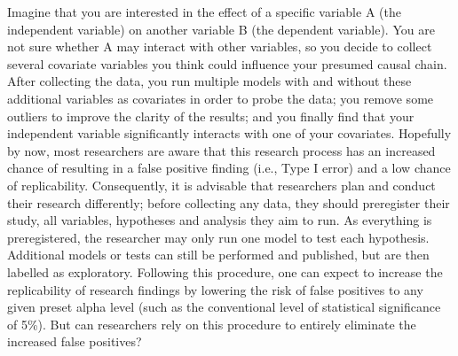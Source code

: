 Imagine that you are interested in the effect of a specific variable A (the independent variable) on another variable B (the dependent variable). You are not sure whether A may interact with other variables, so you decide to collect several covariate variables you think could influence your presumed causal chain. After collecting the data, you run multiple models with and without these additional variables as covariates in order to probe the data; you remove some outliers to improve the clarity of the results; and you finally find that your independent variable significantly interacts with one of your covariates. Hopefully by now, most researchers are aware that this research process has an increased chance of resulting in a false positive finding (i.e., Type I error) and a low chance of replicability. Consequently, it is advisable that researchers plan and conduct their research differently; before collecting any data, they should preregister their study, all variables, hypotheses and analysis they aim to run. As everything is preregistered, the researcher may only run one model to test each hypothesis. Additional models or tests can still be performed and published, but are then labelled as exploratory. Following this procedure, one can expect to increase the replicability of research findings by lowering the risk of false positives to any given preset alpha level (such as the conventional level of statistical significance of 5\%). But can researchers rely on this procedure to entirely eliminate the increased false positives? \\

